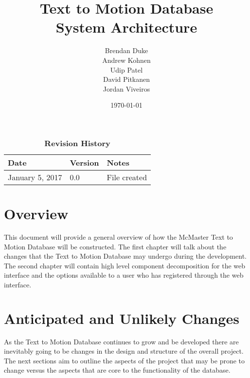 \documentclass{scrreprt}
\begin{document}
\title{\bf Text to Motion Database\\[\baselineskip]\Large System Architecture}
\author{Brendan Duke\\Andrew Kohnen\\Udip Patel\\David Pitkanen\\Jordan Viveiros}
\date{\today}

\maketitle

\tableofcontents


\begin{table}[bp]
\caption*{\bf Revision History}
\begin{tabularx}{\textwidth}{p{3.5cm}p{2cm}X}
\toprule {\bf Date} & {\bf Version} & {\bf Notes}\\
\midrule
January 5, 2017 & 0.0 & File created\\
\bottomrule
\end{tabularx}
\end{table}

\newpage


\chapter{Overview}

This document will provide a general overview of how the McMaster Text to
Motion Database will be constructed. The first chapter will talk about the
changes that the Text to Motion Database may undergo during the development.
The second chapter will contain high level component decomposition for the web
interface and the options available to a user who has registered through the
web interface.

\chapter{Anticipated and Unlikely Changes}

As the Text to Motion Database continues to grow and be developed there are
inevitably going to be changes in the design and structure of the overall
project. The next sections aim to outline the aspects of the project that may
be prone to change versus the aspects that are core to the functionality of the
database.
\end{document}

